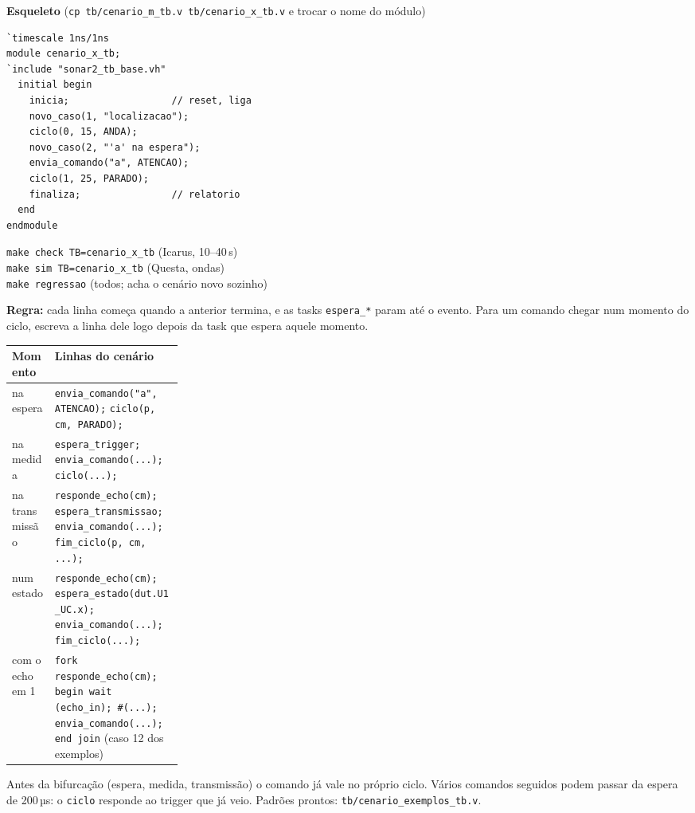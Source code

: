 \documentclass[9pt,a4paper]{extarticle}
\newcommand{\s}[1]{\texttt{#1}}          %
\begin{document}
\begin{minipage}[t]{0.45\linewidth}
\vspace{0pt}
\textbf{Esqueleto} (\s{cp tb/cenario\_m\_tb.v tb/cenario\_x\_tb.v} e trocar o nome do módulo)
\begin{footnotesize}
\begin{verbatim}
`timescale 1ns/1ns
module cenario_x_tb;
`include "sonar2_tb_base.vh"
  initial begin
    inicia;                  // reset, liga
    novo_caso(1, "localizacao");
    ciclo(0, 15, ANDA);
    novo_caso(2, "'a' na espera");
    envia_comando("a", ATENCAO);
    ciclo(1, 25, PARADO);
    finaliza;                // relatorio
  end
endmodule
\end{verbatim}
\end{footnotesize}
{\raggedright
\s{make check TB=cenario\_x\_tb} (Icarus, 10--40\,s)\\
\s{make sim TB=cenario\_x\_tb} (Questa, ondas)\\
\s{make regressao} (todos; acha o cenário novo sozinho)\par}
\end{minipage}\hfill
\begin{minipage}[t]{0.53\linewidth}
\vspace{0pt}
\textbf{Regra:} cada linha começa quando a anterior termina, e as tasks
\s{espera\_*} param até o evento. Para um comando chegar num momento do ciclo,
escreva a linha dele logo depois da task que espera aquele momento.

\begin{tabularx}{\linewidth}{@{}>{\raggedright\arraybackslash}p{0.25\linewidth} Y@{}}
\toprule
Momento & Linhas do cenário \\
\midrule
na espera & \s{envia\_comando("a", ATENCAO);} \s{ciclo(p, cm, PARADO);} \\
na medida & \s{espera\_trigger;} \s{envia\_comando(...);} \s{ciclo(...);} \\
na transmissão & \s{responde\_echo(cm);} \s{espera\_transmissao;} \s{envia\_comando(...);} \s{fim\_ciclo(p, cm, ...);} \\
num estado & \s{responde\_echo(cm);} \s{espera\_estado(dut.U1\_UC.x);} \s{envia\_comando(...);} \s{fim\_ciclo(...);} \\
com o echo em 1 & \s{fork responde\_echo(cm); begin wait (echo\_in); \#(...); envia\_comando(...); end join} (caso 12 dos exemplos) \\
\bottomrule
\end{tabularx}

Antes da bifurcação (espera, medida, transmissão) o comando já vale no próprio
ciclo. Vários comandos seguidos podem passar da espera de 200\,µs: o \s{ciclo}
responde ao trigger que já veio. Padrões prontos: \s{tb/cenario\_exemplos\_tb.v}.
\end{minipage}
\end{document}
